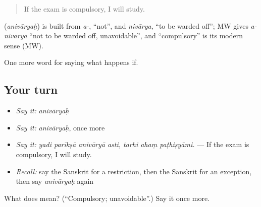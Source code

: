\begin{quote}
If the exam is compulsory, I will study.
\end{quote}

\begin{cousinweb}
\textbf{} (\emph{anivāryaḥ}) is built from \emph{a-}, \textquotedblleft{}not\textquotedblright{}, and \emph{nivārya}, \textquotedblleft{}to be warded off\textquotedblright{}; MW gives \emph{a-nivārya} \textquotedblleft{}not to be warded off, unavoidable\textquotedblright{}, and \textquotedblleft{}compulsory\textquotedblright{} is its modern sense (MW).
\end{cousinweb}

\begin{grammarlens}[title={What you've built}]
One more word for saying what happens if.
\end{grammarlens}

\subsection*{Your turn}
\begin{itemize}
\raggedright
  \item \emph{Say it:} \emph{anivāryaḥ}
  \item \emph{Say it:} \emph{anivāryaḥ}, once more
  \item \emph{Say it:} \emph{yadi parīkṣā anivāryā asti, tarhi ahaṃ paṭhiṣyāmi.} — If the exam is compulsory, I will study.
  \item \emph{Recall:} say the Sanskrit for a restriction, then the Sanskrit for an exception, then say \emph{anivāryaḥ} again
\end{itemize}

\begin{tcolorbox}[breakable,colback=teal!4,colframe=teal!35!black,title={Before you move on}]
What does  mean? (\textquotedblleft{}Compulsory; unavoidable\textquotedblright{}.) Say it once more.
\end{tcolorbox}
